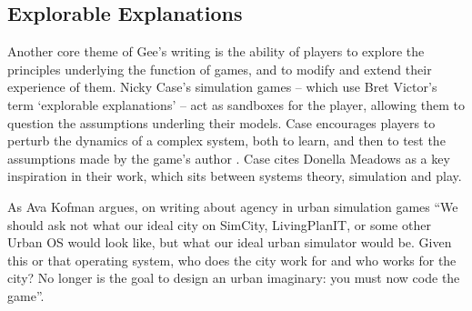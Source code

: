 \documentclass[nofonts,nols,justified,nobib]{tufte-book}
\begin{document}
\subsection*{Explorable Explanations}
Another core theme of Gee's writing is the ability of players to explore the principles underlying the function of games, and to modify and extend their experience of them. Nicky Case's simulation games -- which use Bret Victor's term `explorable explanations' -- act as sandboxes for the player, allowing them to question the assumptions underling their models. Case encourages players to perturb the dynamics of a complex system, both to learn, and then to test the assumptions made by the game's author \cite{case_how_2016}. Case cites Donella Meadows as a key inspiration in their work, which sits between systems theory, simulation and play.

As Ava Kofman argues, on writing about agency in urban simulation games ``We should ask not what our ideal city on SimCity, LivingPlanIT, or some other Urban OS would look like, but what our ideal urban simulator would be. Given this or that operating system, who does the city work for and who works for the city? No longer is the goal to design an urban imaginary: you must now code the game''.
\end{document}

